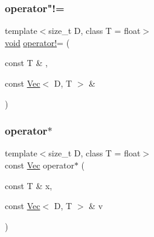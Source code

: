 \mbox{\label{classtrimesh_1_1Vec_a326a6a568c33a88dabee601c163455ee}} 
\subsubsection{\texorpdfstring{operator"!=}{operator!=}\hspace{0.1cm}{\footnotesize\ttfamily [2/2]}}
{\footnotesize\ttfamily template$<$size\+\_\+t D, class T = float$>$ \\
\hyperlink{namespacetrimesh_a784ddfd979e1c579bda795a8edfc3f43}{void} \hyperlink{namespacetrimesh_af767195cb37f08a930059365eb736329}{operator!}= (\begin{DoxyParamCaption}\item[{const T \&}]{,  }\item[{const \hyperlink{classtrimesh_1_1Vec}{Vec}$<$ D, T $>$ \&}]{ }\end{DoxyParamCaption})\hspace{0.3cm}{\ttfamily [friend]}}

\mbox{\label{classtrimesh_1_1Vec_abf00d36d09c57aa39e823eb8055c0ae4}} 
\subsubsection{\texorpdfstring{operator$\ast$}{operator*}\hspace{0.1cm}{\footnotesize\ttfamily [1/2]}}
{\footnotesize\ttfamily template$<$size\+\_\+t D, class T = float$>$ \\
const \hyperlink{classtrimesh_1_1Vec}{Vec} operator$\ast$ (\begin{DoxyParamCaption}\item[{const T \&}]{x,  }\item[{const \hyperlink{classtrimesh_1_1Vec}{Vec}$<$ D, T $>$ \&}]{v }\end{DoxyParamCaption})\hspace{0.3cm}{\ttfamily [friend]}}

\mbox{\label{classtrimesh_1_1Vec_adf4c943b26d721efc55eda5d6a6965fc}} 
